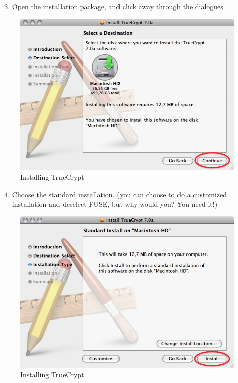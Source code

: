 \begin{enumerate}[1.]
\setcounter{enumi}{2}
\item
  Open the installation package, and click away through the dialogues.
\end{enumerate}
\begin{figure}[htbp]
\centering
\includegraphics{tc_011.jpg}
\caption{Installing TrueCrypt}
\end{figure}

\begin{enumerate}[1.]
\setcounter{enumi}{3}
\item
  Choose the standard installation. (you can choose to do a customized
  installation and deselect FUSE, but why would you? You need it!)
\end{enumerate}
\begin{figure}[htbp]
\centering
\includegraphics{tc_012.jpg}
\caption{Installing TrueCrypt}
\end{figure}


